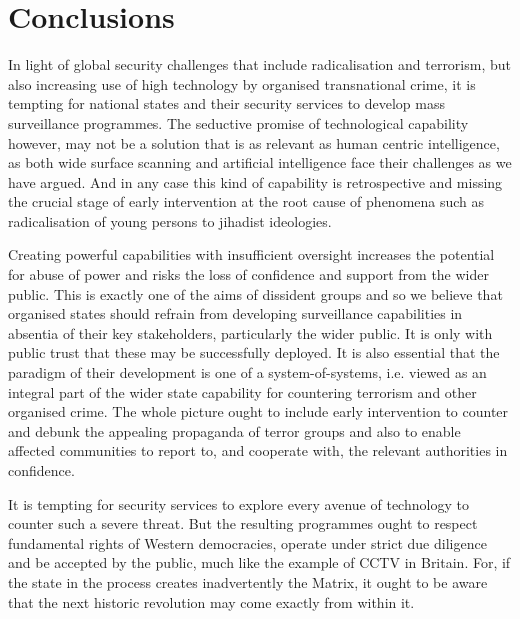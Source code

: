 \documentclass{llncs}
\begin{document}
\section{Conclusions}
\label{sec:Conclusions}
In light of global security challenges that include radicalisation and terrorism, but also increasing use of high technology by organised transnational crime, it is tempting for national states and their security services to develop mass surveillance programmes. The seductive promise of technological capability however, may not be a solution that is as relevant as human centric intelligence, as both wide surface scanning and artificial intelligence face their challenges as we have argued. And in any case this kind of capability is retrospective and missing the crucial stage of early intervention at the root cause of phenomena such as radicalisation of young persons to jihadist ideologies.

Creating powerful capabilities with insufficient oversight increases the potential for abuse of power and risks the loss of confidence and support from the wider public. This is exactly one of the aims of dissident groups and so we believe that organised states should refrain from developing surveillance capabilities in absentia of their key stakeholders, particularly the wider public. It is only with public trust that these may be successfully deployed. It is also essential that the paradigm of their development is one of a system-of-systems, i.e. viewed as an integral part of the wider state capability for countering terrorism and other organised crime. The whole picture ought to include early intervention to counter and debunk the appealing propaganda of terror groups and also to enable affected communities to report to, and cooperate with, the relevant authorities in confidence.

It is tempting for security services to explore every avenue of technology to counter such a severe threat. But the resulting programmes ought to respect fundamental rights of Western democracies, operate under strict due diligence and be accepted by the public, much like the example of CCTV in Britain. For, if the state in the process creates inadvertently the Matrix, it ought to be aware that the next historic revolution may come exactly from within it.
\end{document}
